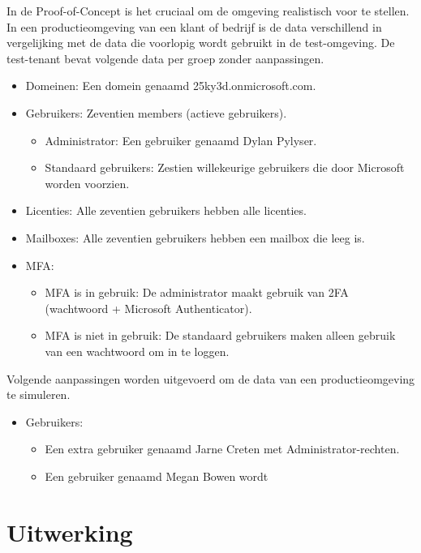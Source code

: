 In de Proof-of-Concept is het cruciaal om de omgeving realistisch voor te stellen. In een productieomgeving van een klant of bedrijf is de data verschillend in vergelijking met de data die voorlopig wordt gebruikt in de test-omgeving. De test-tenant bevat volgende data per groep zonder aanpassingen.

\begin{itemize}
    \item Domeinen: Een domein genaamd 25ky3d.onmicrosoft.com.
    \item Gebruikers: Zeventien members (actieve gebruikers).
    \begin{itemize}
        \item Administrator: Een gebruiker genaamd Dylan Pylyser.
        \item Standaard gebruikers: Zestien willekeurige gebruikers die door Microsoft worden voorzien.
    \end{itemize}
    \item Licenties: Alle zeventien gebruikers hebben alle licenties.
    \item Mailboxes: Alle zeventien gebruikers hebben een mailbox die leeg is.
    \item \Ac{MFA}: 
        \begin{itemize}
            \item \ac{MFA} is in gebruik: De administrator maakt gebruik van \ac{2FA} (wachtwoord + Microsoft Authenticator).
            \item \Ac{MFA} is niet in gebruik: De standaard gebruikers maken alleen gebruik van een wachtwoord om in te loggen.
        \end{itemize}
\end{itemize}

Volgende aanpassingen worden uitgevoerd om de data van een productieomgeving te simuleren.

\begin{itemize}
    \item Gebruikers: 
    \begin{itemize}
        \item Een extra gebruiker genaamd Jarne Creten met Administrator-rechten.
        \item Een gebruiker genaamd Megan Bowen wordt %
    \end{itemize}
\end{itemize}

\section{Uitwerking}


